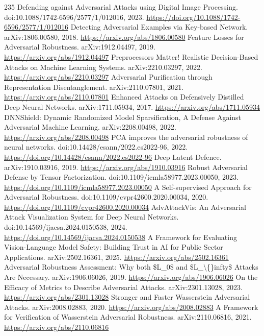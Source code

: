 \documentclass[11pt]{article}
\begin{document}
\begin{thebibliography}{235}
 Defending against Adversarial Attacks using Digital Image Processing. doi:10.1088/1742-6596/2577/1/012016, 2023. \url{https://doi.org/10.1088/1742-6596/2577/1/012016}
 Detecting Adversarial Examples via Key-based Network. arXiv:1806.00580, 2018. \url{https://arxiv.org/abs/1806.00580}
 Feature Losses for Adversarial Robustness. arXiv:1912.04497, 2019. \url{https://arxiv.org/abs/1912.04497}
 Preprocessors Matter! Realistic Decision-Based Attacks on Machine Learning Systems. arXiv:2210.03297, 2022. \url{https://arxiv.org/abs/2210.03297}
 Adversarial Purification through Representation Disentanglement. arXiv:2110.07801, 2021. \url{https://arxiv.org/abs/2110.07801}
 Enhanced Attacks on Defensively Distilled Deep Neural Networks. arXiv:1711.05934, 2017. \url{https://arxiv.org/abs/1711.05934}
 DNNShield: Dynamic Randomized Model Sparsification, A Defense Against Adversarial Machine Learning. arXiv:2208.00498, 2022. \url{https://arxiv.org/abs/2208.00498}
 PCA improves the adversarial robustness of neural networks. doi:10.14428/esann/2022.es2022-96, 2022. \url{https://doi.org/10.14428/esann/2022.es2022-96}
 Deep Latent Defence. arXiv:1910.03916, 2019. \url{https://arxiv.org/abs/1910.03916}
 Robust Adversarial Defense by Tensor Factorization. doi:10.1109/icmla58977.2023.00050, 2023. \url{https://doi.org/10.1109/icmla58977.2023.00050}
 A Self-supervised Approach for Adversarial Robustness. doi:10.1109/cvpr42600.2020.00034, 2020. \url{https://doi.org/10.1109/cvpr42600.2020.00034}
 AdvAttackVis: An Adversarial Attack Visualization System for Deep Neural Networks. doi:10.14569/ijacsa.2024.0150538, 2024. \url{https://doi.org/10.14569/ijacsa.2024.0150538}
 A Framework for Evaluating Vision-Language Model Safety: Building Trust in AI for Public Sector Applications. arXiv:2502.16361, 2025. \url{https://arxiv.org/abs/2502.16361}
 Adversarial Robustness Assessment: Why both \$L\_0\$ and \$L\_\textbackslash\{\}infty\$ Attacks Are Necessary. arXiv:1906.06026, 2019. \url{https://arxiv.org/abs/1906.06026}
 On the Efficacy of Metrics to Describe Adversarial Attacks. arXiv:2301.13028, 2023. \url{https://arxiv.org/abs/2301.13028}
 Stronger and Faster Wasserstein Adversarial Attacks. arXiv:2008.02883, 2020. \url{https://arxiv.org/abs/2008.02883}
 A Framework for Verification of Wasserstein Adversarial Robustness. arXiv:2110.06816, 2021. \url{https://arxiv.org/abs/2110.06816}

\end{thebibliography}
\end{document}
